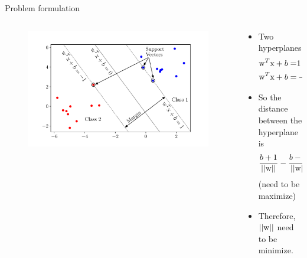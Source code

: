 \begin{frame}{Problem formulation}
\begin{columns}
\begin{column}{6cm}
\begin{figure}
\includegraphics[scale=0.43]{Figures/data5}
\end{figure}
\end{column}
\begin{column}{5cm}

\begin{itemize}
\item Two hyperplanes
\begin{align*}
{\rm w}^T{\rm x}+b=&1\\
{\rm w}^T{\rm x}+b=&-1
\end{align*}
\item So the distance between the hyperplane is
\[\frac{b+1}{||{\rm w}||}-\frac{b-1}{||{\rm w}||}=\frac{2}{||{\rm w}||}\]
(need to be maximize)
\item Therefore, $||{\rm w}||$ need to be minimize.
\end{itemize}
\end{column}
\end{columns}
\end{frame}


